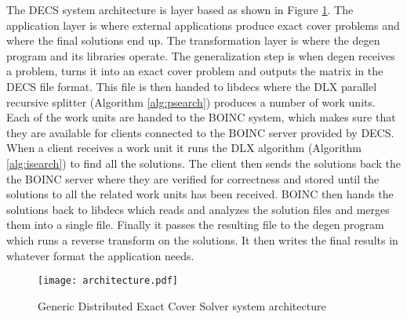 The DECS system architecture is layer based as shown in Figure \ref{fig:architecture}.
The application layer is where external applications produce exact cover problems and where the final solutions end up.
The transformation layer is where the degen program and its libraries operate.
The generalization step is when degen receives a problem, turns it into an exact cover problem and outputs the matrix in the DECS file format.
This file is then handed to libdecs where the DLX parallel recursive splitter (Algorithm \ref{alg:psearch}) produces a number of work units.
Each of the work units are handed to the BOINC system, which makes sure that they are available for clients connected to the BOINC server provided by DECS.
When a client receives a work unit it runs the DLX algorithm (Algorithm \ref{alg:isearch}) to find all the solutions.
The client then sends the solutions back the the BOINC server where they are verified for correctness and stored until the solutions to all the related work units has been received.
BOINC then hands the solutions back to libdecs which reads and analyzes the solution files and merges them into a single file.
Finally it passes the resulting file to the degen program which runs a reverse transform on the solutions.
It then writes the final results in whatever format the application needs.

\begin{figure}[htbp]
	\centering 
	\texttt{[image: architecture.pdf]}
	\caption{Generic Distributed Exact Cover Solver system architecture}
	\label{fig:architecture}
\end{figure}






